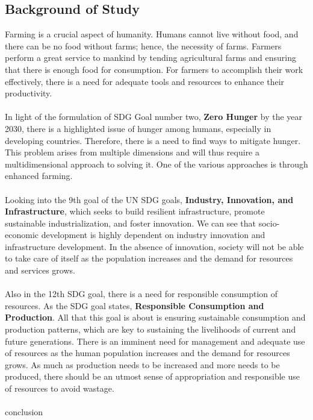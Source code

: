 \documentclass[12pt, a4paper]{article}
\begin{document}
\subsection{Background of Study}
Farming is a crucial aspect of humanity. Humans cannot live without food, and there can be no food without farms; hence, the necessity of farms. Farmers perform a great service to mankind by tending agricultural farms and ensuring that there is enough food for consumption. For farmers to accomplish their work effectively, there is a need for adequate tools and resources to enhance their productivity.\\
\\
In light of the formulation of SDG Goal number two, \textbf{Zero Hunger} by the year 2030\cite{unhunger}, there is a highlighted issue of hunger among humans, especially in developing countries. Therefore, there is a need to find ways to mitigate hunger. This problem arises from multiple dimensions and will thus require a multidimensional approach to solving it. One of the various approaches is through enhanced farming.\\
\\
Looking into the 9th goal of the UN SDG goals, \textbf{Industry, Innovation, and Infrastructure}, which seeks to build resilient infrastructure, promote sustainable industrialization, and foster innovation\cite{uninnovation}. We can see that socio-economic development is highly dependent on industry innovation and infrastructure development. In the absence of innovation, society will not be able to take care of itself as the population increases and the demand for resources and services grows.\\
\\
Also in the 12th SDG goal, there is a need for responsible consumption of resources. As the SDG goal states, \textbf{Responsible Consumption and Production}. All that this goal is about is ensuring sustainable consumption and production patterns, which are key to sustaining the livelihoods of current and future generations\cite{unresponsible}. There is an imminent need for management and adequate use of resources as the human population increases and the demand for resources grows. As much as production needs to be increased and more needs to be produced, there should be an utmost sense of appropriation and responsible use of resources to avoid wastage.\\
\\
conclusion
\newpage
\end{document}

